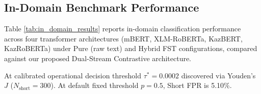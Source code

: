 \subsection{In-Domain Benchmark Performance}
Table \ref{tab:in_domain_results} reports in-domain classification performance across four transformer architectures (mBERT, XLM-RoBERTa, KazBERT, KazRoBERTa) under Pure (raw text) and Hybrid FST configurations, compared against our proposed Dual-Stream Contrastive architecture.

\begin{table}[htbp]
\centering
\caption{In-domain AI-generated text detection performance on KazAI-Detect held-out test set ($N=4,000$). FST segmentation and dual-stream fusion substantially eliminate false positive accusations on short reviews ($\le 60$ characters).}
\label{tab:in_domain_results}
\begin{flushleft}
\footnotesize *At calibrated operational decision threshold $\tau^* = 0.0002$ discovered via Youden's $J$ ($N_{\text{short}} = 300$). At default fixed threshold $p=0.5$, Short FPR is 5.10\%.
\end{flushleft}
\end{table}

